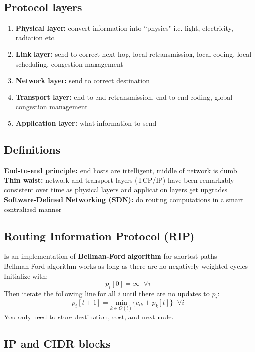 \documentclass{article}
\begin{document}
\subsection{Protocol layers}

\begin{enumerate}
\item \textbf{Physical layer:} convert information into ``physics" i.e. light, electricity, radiation etc.
\item \textbf{Link layer:} send to correct next hop, local retransmission, local coding, local scheduling, congestion management
\item \textbf{Network layer:} send to correct destination
\item \textbf{Transport layer:} end-to-end retransmission, end-to-end coding, global congestion management
\item \textbf{Application layer:} what information to send
\end{enumerate}

\subsection{Definitions}

\textbf{End-to-end principle:} end hosts are intelligent, middle of network is dumb \\
\textbf{Thin waist:} network and transport layers (TCP/IP) have been remarkably consistent over time as physical layers and application layers get upgrades \\
\textbf{Software-Defined Networking (SDN):} do routing computations in a smart centralized manner

\subsection{Routing Information Protocol (RIP)}

Is an implementation of \textbf{Bellman-Ford algorithm} for shortest paths \\
Bellman-Ford algorithm works as long as there are no negatively weighted cycles \\
Initialize with:
$$ p_i[0] = \infty \; \; \forall i $$
Then iterate the following line for all $i$ until there are no updates to $p_i$:
$$ p_i[t + 1] = \underset{k \in O(i)}{\text{min}} \lbrace c_{ik} + p_k[t] \rbrace \; \; \forall i $$
You only need to store destination, cost, and next node.

\subsection{IP and CIDR blocks}
\end{document}
